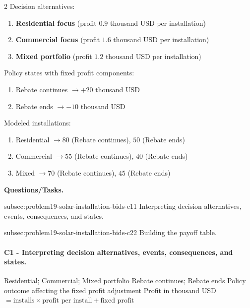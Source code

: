 	\begin{multicols}{2}
		Decision alternatives:
		\begin{enumerate}[label=\arabic*.]
			\item \textbf{Residential focus} (profit $0.9$ thousand USD per installation)
			\item \textbf{Commercial focus} (profit $1.6$ thousand USD per installation)
			\item \textbf{Mixed portfolio} (profit $1.2$ thousand USD per installation)
		\end{enumerate}

		Policy states with fixed profit components:
		\begin{enumerate}[label=\arabic*.]
			\item Rebate continues $\to +20$ thousand USD
			\item Rebate ends $\to -10$ thousand USD
		\end{enumerate}

			\columnbreak

		Modeled installations:
		\begin{enumerate}[label=\arabic*.]
			\item Residential $\to 80$ (Rebate continues), $50$ (Rebate ends)
			\item Commercial $\to 55$ (Rebate continues), $40$ (Rebate ends)
			\item Mixed $\to 70$ (Rebate continues), $45$ (Rebate ends)
		\end{enumerate}
	\end{multicols}

	\textbf{Questions/Tasks.}
	\begin{enumerate}
		\CriterionTask
		{subsec:problem19-solar-installation-bids-c1}{1}
		{Interpreting decision alternatives, events, consequences, and states.}

		\CriterionTask
		{subsec:problem19-solar-installation-bids-c2}{2}
		{Building the payoff table.}
	\end{enumerate}

	\paragraph*{C1 - Interpreting decision alternatives, events, consequences, and states.}
	\label{subsec:problem19-solar-installation-bids-c1}
	\DecisionElementsTable
	{Residential; Commercial; Mixed portfolio}
	{Rebate continues; Rebate ends}
	{Policy outcome affecting the fixed profit adjustment}
	{Profit in thousand USD $= \text{installs} \times \text{profit per install} + \text{fixed profit}$}

